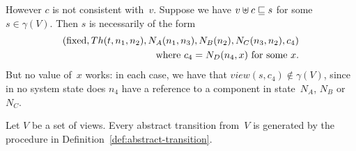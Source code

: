 However $c$ is not consistent with~$v$.  Suppose we have \( v \uplus
c \sqsubseteq s \) for some $s \in \gamma(V)$.  Then $s$ is necessarily of the form
\[
\begin{align}
(\mathrm{fixed}, Th(t,n_1,n_2), N_A(n_1, n_3), N_B(n_2), N_C(n_3,n_2), c_4) \\
\qquad \mbox{where $c_4 = N_D(n_4,x)$ for some $x$.}
\end{align}
\]
But no value of~$x$ works: in each case, we have that $view(s, c_4) \nin
\gamma(V)$, since in no system state does $n_4$ have a reference to a
component in state~$N_A$, $N_B$ or~$N_C$.



\begin{prop}
\label{lem:abstract-transitions-sound}
Let $V$ be a set of views.  Every abstract transition from~$V$ is generated by
the procedure in Definition~\ref{def:abstract-transition}.
\end{prop}

